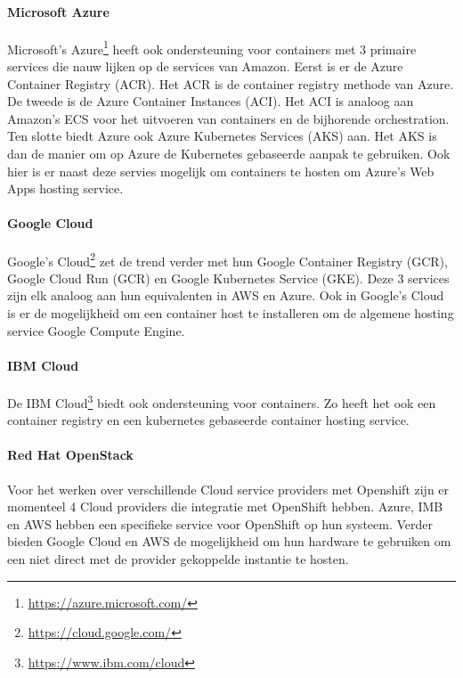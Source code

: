 \paragraph{Microsoft Azure}
Microsoft’s Azure\footnote{\url{https://azure.microsoft.com/}} heeft ook ondersteuning voor containers met 3 primaire services die nauw lijken op de services van Amazon. Eerst is er de Azure Container Registry (ACR). Het ACR is de container registry methode van Azure. De tweede is de Azure Container Instances (ACI). Het ACI is analoog aan  Amazon’s ECS voor het uitvoeren van containers en de bijhorende orchestration. Ten slotte biedt Azure ook Azure Kubernetes Services (AKS) aan. Het AKS is dan de manier om op Azure de Kubernetes gebaseerde aanpak te gebruiken. Ook hier is er naast deze servies mogelijk om containers te hosten om Azure’s Web Apps hosting service.
\paragraph{Google Cloud}
Google’s Cloud\footnote{\url{https://cloud.google.com/}} zet de trend verder met hun Google Container Registry (GCR), Google Cloud Run (GCR) en Google Kubernetes Service (GKE). Deze 3 services zijn elk analoog aan hun equivalenten in AWS en Azure. Ook in Google's Cloud is er de mogelijkheid om een container host te installeren om de algemene hosting service Google Compute Engine.
\paragraph{IBM Cloud}
De IBM Cloud\footnote{\url{https://www.ibm.com/cloud}} biedt ook ondersteuning voor containers. Zo heeft het ook een container registry en een kubernetes gebaseerde container hosting service.
\paragraph{Red Hat OpenStack}
Voor het werken over verschillende Cloud service providers met Openshift zijn er momenteel 4 Cloud providers die integratie met OpenShift hebben. Azure, IMB en AWS hebben een specifieke service voor OpenShift op hun systeem. Verder bieden Google Cloud en AWS de mogelijkheid om hun hardware te gebruiken om een niet direct met de provider gekoppelde instantie te hosten.



